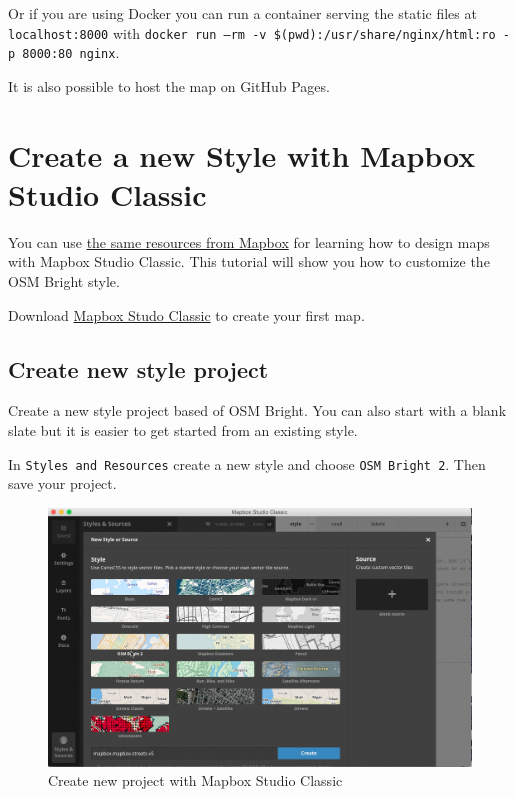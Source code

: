 {Or if you are using Docker you can run a container serving the static files at
\texttt{localhost:8000} with \texttt{docker run --rm -v \$(pwd):/usr/share/nginx/html:ro -p 8000:80 nginx}.

It is also possible to host the map on GitHub Pages.



\section*{Create a new Style with Mapbox Studio
Classic}\label{create-a-new-style-with-mapbox-studio-classic}

You can use
\href{https://www.mapbox.com/help/getting-started-studio/}{the same
resources from Mapbox} for learning how to design maps with Mapbox
Studio Classic. This tutorial will show you how to customize the OSM
Bright style.

Download \href{https://www.mapbox.com/mapbox-studio-classic/}{Mapbox
Studo Classic} to create your first map.

\subsection*{Create new style project}

Create a new style project based of OSM Bright. You can also start with
a blank slate but it is easier to get started from an existing style.

In \texttt{Styles\ and\ Resources} create a new style and choose
\texttt{OSM\ Bright\ 2}. Then save your project.

\begin{figure}[H]
\centering
\includegraphics[width=1\textwidth]{images/mapbox_classic_create_project.png}
\caption{Create new project with Mapbox Studio Classic}
\end{figure}

}

